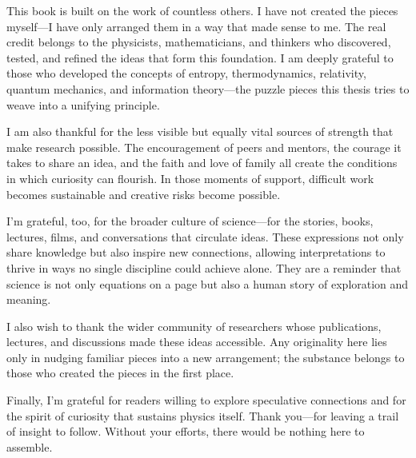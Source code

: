 This book is built on the work of countless others. I have not created the pieces myself—I have only arranged them in a way that made sense to me. The real credit belongs to the physicists, mathematicians, and thinkers who discovered, tested, and refined the ideas that form this foundation. I am deeply grateful to those who developed the concepts of entropy, thermodynamics, relativity, quantum mechanics, and information theory—the puzzle pieces this thesis tries to weave into a unifying principle.

I am also thankful for the less visible but equally vital sources of strength that make research possible. The encouragement of peers and mentors, the courage it takes to share an idea, and the faith and love of family all create the conditions in which curiosity can flourish. In those moments of support, difficult work becomes sustainable and creative risks become possible.

I’m grateful, too, for the broader culture of science—for the stories, books, lectures, films, and conversations that circulate ideas. These expressions not only share knowledge but also inspire new connections, allowing interpretations to thrive in ways no single discipline could achieve alone. They are a reminder that science is not only equations on a page but also a human story of exploration and meaning.

I also wish to thank the wider community of researchers whose publications, lectures, and discussions made these ideas accessible. Any originality here lies only in nudging familiar pieces into a new arrangement; the substance belongs to those who created the pieces in the first place.

Finally, I’m grateful for readers willing to explore speculative connections and for the spirit of curiosity that sustains physics itself. Thank you—for leaving a trail of insight to follow. Without your efforts, there would be nothing here to assemble.
